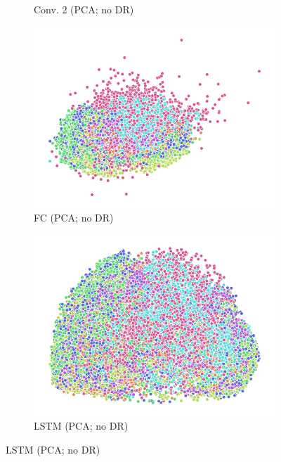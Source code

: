 \begin{figure}
\begin{subfigure}{0.22\textwidth}
    \caption{Conv. 2 (PCA; no DR)}
  \end{subfigure}
  \begin{subfigure}{0.22\textwidth}
    \includegraphics[width=\textwidth]{figures/chapter6/embeddings/jaco_no-DR_prop_fc1_PCA.png}
    \caption{FC (PCA; no DR)}
  \end{subfigure}
  \begin{subfigure}{0.22\textwidth}
    \includegraphics[width=\textwidth]{figures/chapter6/embeddings/jaco_no-DR_prop_h_PCA.png}
    \caption{LSTM (PCA; no DR)}
  \end{subfigure}


\end{figure}
